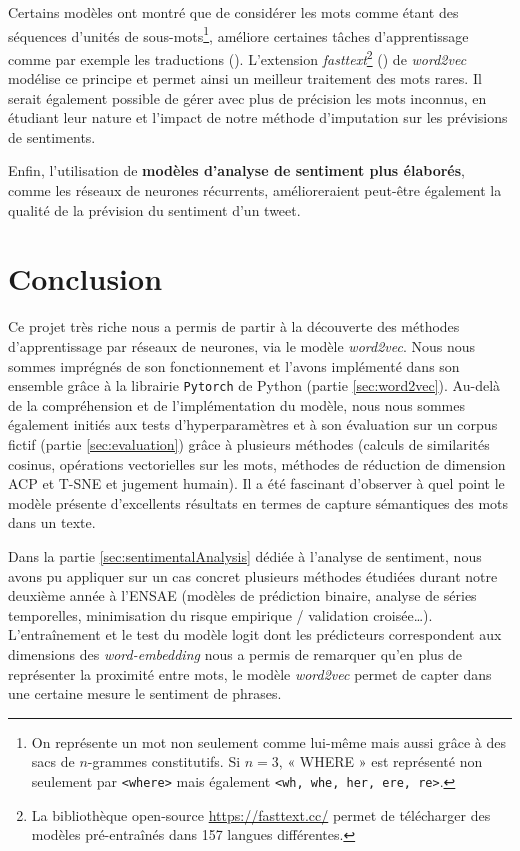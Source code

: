 \documentclass[11pt,french,french]{article}
\let\rmarkdownfootnote\footnote%
\def\footnote{\protect\rmarkdownfootnote}
\begin{document}
Certains modèles ont montré que de considérer les mots comme étant des
séquences d'unités de sous-mots\footnote{On représente un mot non
  seulement comme lui-même mais aussi grâce à des sacs de \(n\)-grammes
  constitutifs. Si \(n = 3\), « WHERE » est représenté non seulement par
  \texttt{\textless{}where\textgreater{}} mais également
  \texttt{\textless{}wh,\ whe,\ her,\ ere,\ re\textgreater{}}.},
améliore certaines tâches d'apprentissage comme par exemple les
traductions (\cite{Sennrich}). L'extension \emph{fasttext}\footnote{La
  bibliothèque open-source \url{https://fasttext.cc/} permet de
  télécharger des modèles pré-entraînés dans 157 langues différentes.}
(\cite{Bojanowski}) de \emph{word2vec} modélise ce principe et permet
ainsi un meilleur traitement des mots rares. Il serait également
possible de gérer avec plus de précision les mots inconnus, en étudiant
leur nature et l'impact de notre méthode d'imputation sur les prévisions
de sentiments.

Enfin, l'utilisation de \textbf{modèles d'analyse de sentiment plus
élaborés}, comme les réseaux de neurones récurrents, amélioreraient
peut-être également la qualité de la prévision du sentiment d'un tweet.

\newpage

\section*{Conclusion}\label{conclusion}

Ce projet très riche nous a permis de partir à la découverte des
méthodes d'apprentissage par réseaux de neurones, via le modèle
\emph{word2vec}. Nous nous sommes imprégnés de son fonctionnement et
l'avons implémenté dans son ensemble grâce à la librairie
\texttt{Pytorch} de Python (partie \ref{sec:word2vec}). Au-delà de la
compréhension et de l'implémentation du modèle, nous nous sommes
également initiés aux tests d'hyperparamètres et à son évaluation sur un
corpus fictif (partie \ref{sec:evaluation}) grâce à plusieurs méthodes
(calculs de similarités cosinus, opérations vectorielles sur les mots,
méthodes de réduction de dimension ACP et T-SNE et jugement humain). Il
a été fascinant d'observer à quel point le modèle présente d'excellents
résultats en termes de capture sémantiques des mots dans un texte.

Dans la partie \ref{sec:sentimentalAnalysis} dédiée à l'analyse de
sentiment, nous avons pu appliquer sur un cas concret plusieurs méthodes
étudiées durant notre deuxième année à l'ENSAE (modèles de prédiction
binaire, analyse de séries temporelles, minimisation du risque empirique
/ validation croisée\dots). L'entraînement et le test du modèle logit
dont les prédicteurs correspondent aux dimensions des
\emph{word-embedding} nous a permis de remarquer qu'en plus de
représenter la proximité entre mots, le modèle \emph{word2vec} permet de
capter dans une certaine mesure le sentiment de phrases.
\end{document}
